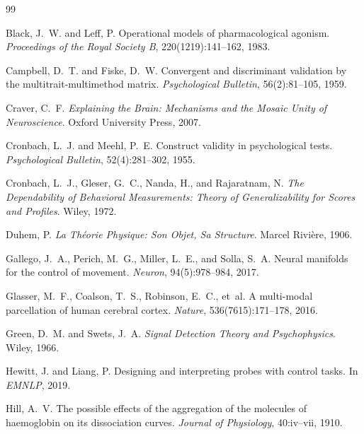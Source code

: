 \documentclass[10pt]{article}
\begin{document}
\begin{thebibliography}{99}

Black, J.~W. and Leff, P.
\newblock Operational models of pharmacological agonism.
\newblock \emph{Proceedings of the Royal Society B}, 220(1219):141--162, 1983.

Campbell, D.~T. and Fiske, D.~W.
\newblock Convergent and discriminant validation by the multitrait-multimethod matrix.
\newblock \emph{Psychological Bulletin}, 56(2):81--105, 1959.

Craver, C.~F.
\newblock \emph{Explaining the Brain: Mechanisms and the Mosaic Unity of Neuroscience}.
\newblock Oxford University Press, 2007.

Cronbach, L.~J. and Meehl, P.~E.
\newblock Construct validity in psychological tests.
\newblock \emph{Psychological Bulletin}, 52(4):281--302, 1955.

Cronbach, L.~J., Gleser, G.~C., Nanda, H., and Rajaratnam, N.
\newblock \emph{The Dependability of Behavioral Measurements: Theory of Generalizability for Scores and Profiles}.
\newblock Wiley, 1972.

Duhem, P.
\newblock \emph{La Th{\'e}orie Physique: Son Objet, Sa Structure}.
\newblock Marcel Rivi{\`e}re, 1906.

Gallego, J.~A., Perich, M.~G., Miller, L.~E., and Solla, S.~A.
\newblock Neural manifolds for the control of movement.
\newblock \emph{Neuron}, 94(5):978--984, 2017.

Glasser, M.~F., Coalson, T.~S., Robinson, E.~C., et~al.
\newblock A multi-modal parcellation of human cerebral cortex.
\newblock \emph{Nature}, 536(7615):171--178, 2016.

Green, D.~M. and Swets, J.~A.
\newblock \emph{Signal Detection Theory and Psychophysics}.
\newblock Wiley, 1966.

Hewitt, J. and Liang, P.
\newblock Designing and interpreting probes with control tasks.
\newblock In \emph{EMNLP}, 2019.

Hill, A.~V.
\newblock The possible effects of the aggregation of the molecules of haemoglobin on its dissociation curves.
\newblock \emph{Journal of Physiology}, 40:iv--vii, 1910.


\end{thebibliography}
\end{document}
